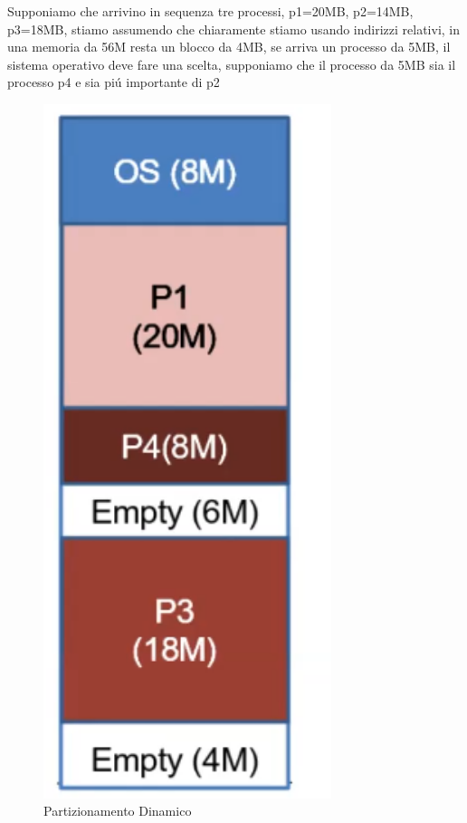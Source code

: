     Supponiamo che arrivino in sequenza tre processi, p1=20MB, p2=14MB, p3=18MB, stiamo
    assumendo che chiaramente stiamo usando indirizzi relativi, in una memoria da 56M
    resta un blocco da 4MB, se arriva un processo da 5MB, il sistema operativo deve fare una
    scelta, supponiamo che il processo da 5MB sia il processo p4 e sia piú importante di p2
    \begin{figure}[H]
        \centering
        \includegraphics[width=0.75\textwidth]{immagini/EsempioPartizionamentoDinamico2}
        \caption{Partizionamento Dinamico}
    \end{figure}

